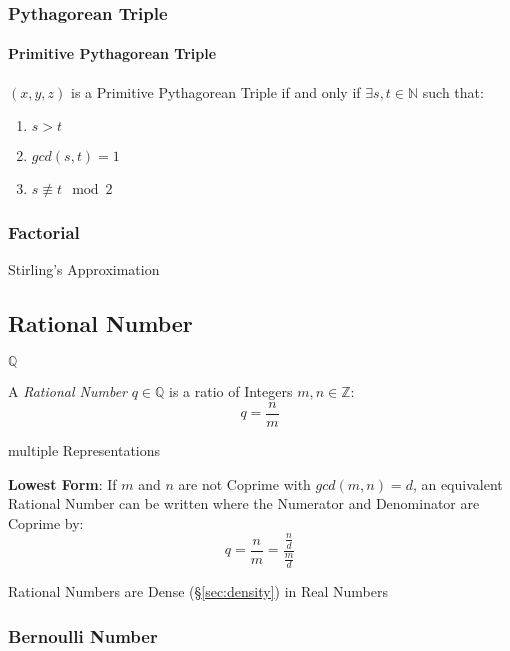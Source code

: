 \subsubsection{Pythagorean Triple}\label{sec:pythagorean_triple}

\paragraph{Primitive Pythagorean Triple}\label{sec:primitive_pythagorean}\hfill

$(x,y,z)$ is a Primitive Pythagorean Triple if and only if $\exists
s,t \in \mathbb{N}$ such that:
\begin{enumerate}
  \item $s > t$
  \item $gcd (s,t) = 1$
  \item $s \not\equiv t \mod 2$
\end{enumerate}



\subsubsection{Factorial}\label{sec:factorial}

Stirling's Approximation



\subsection{Rational Number}\label{sec:rational}

$\mathbb{Q}$

A \emph{Rational Number} $q \in \mathbb{Q}$ is a ratio of Integers
$m,n \in \mathbb{Z}$:
\[
  q = \frac{n}{m}
\]

multiple Representations

\textbf{Lowest Form}: If $m$ and $n$ are not Coprime with $gcd (m,n) =
d$, an equivalent Rational Number can be written where the Numerator
and Denominator are Coprime by:
\[
  q = \frac{n}{m} = \frac{\frac{n}{d}}{\frac{m}{d}}
\]

Rational Numbers are Dense (\S\ref{sec:density}) in Real Numbers



\subsubsection{Bernoulli Number}\label{sec:bernoulli_number}

